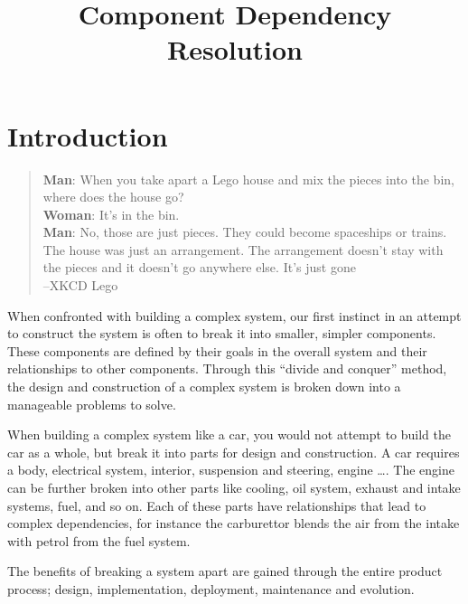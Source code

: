 \documentclass{report}
\title{Component Dependency Resolution}
\begin{document}


\chapter{Introduction}


\begin{quotation}
\textbf{Man}: When you take apart a Lego house and mix the pieces into the bin, where does the house go?\\
\textbf{Woman}: It's in the bin.\\
\textbf{Man}: No, those are just pieces. They could become spaceships or trains. 
The house was just an arrangement. The arrangement doesn't stay with the pieces and it doesn't go anywhere else. It's just gone\\
--XKCD Lego
\end{quotation}

{}When confronted with building a complex system, our first instinct in an attempt to construct the system is often to break it into smaller, simpler components. 
{}These components are defined by their goals in the overall system and their relationships to other components.
{}Through this ``divide and conquer'' method, the design and construction of a complex system is broken down into a manageable problems to solve.

When building a complex system like a car, you would not attempt to build the car as a whole, but break it into parts for design and construction.
A car requires a body, electrical system, interior, suspension and steering, engine \ldots. 
The engine can be further broken into other parts like cooling, oil system, exhaust and intake systems, fuel, and so on.
Each of these parts have relationships that lead to complex dependencies, for instance the carburettor blends the air from the intake with petrol from the fuel system.

The benefits of breaking a system apart are gained through the entire product process; design, implementation, deployment, maintenance and evolution.
\end{document}
